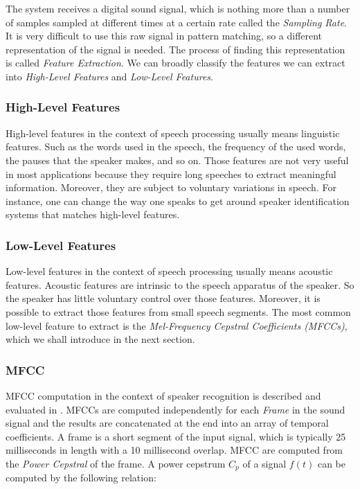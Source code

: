 \documentclass[twocolumn]{article}
\begin{document}
The system receives a digital sound signal, which is nothing more than a number
of samples sampled at different times at a certain rate called the
\emph{Sampling Rate}. It is very difficult to use this raw signal in pattern
matching, so a different representation of the signal is needed. The process of
finding this representation is called \emph{Feature Extraction}. We can broadly
classify the features we can extract into \emph{High-Level Features} and
\emph{Low-Level Features}.

\subsubsection{High-Level Features}

High-level features in the context of speech processing usually means
linguistic features. Such as the words used in the speech, the frequency of the
used words, the pauses that the speaker makes, and so on. Those features are
not very useful in most applications because they require long speeches to
extract meaningful information. Moreover, they are subject to voluntary
variations in speech. For instance, one can change the way one speaks to get
around speaker identification systems that matches high-level features.

\subsubsection{Low-Level Features}

Low-level features in the context of speech processing usually means acoustic
features. Acoustic features are intrinsic to the speech apparatus of the
speaker. So the speaker has little voluntary control over those features.
Moreover, it is possible to extract those features from small speech segments.
The most common low-level feature to extract is the \emph{Mel-Frequency
Cepstral Coefficients (MFCCs)}, which we shall introduce in the next section.

\subsubsection{MFCC}

MFCC computation in the context of speaker recognition is described and
evaluated in \autocite{Sahidullah2012}. MFCCs are computed independently for
each \emph{Frame} in the sound signal and the results are  concatenated at the
end into an array of temporal coefficients. A frame is a short segment of the
input signal, which is typically 25 milliseconds in length with a 10
millisecond overlap. MFCC are computed from the \emph{Power Cepstral} of the
frame. A power cepstrum $C_{p}$ of a signal $f(t)$ can be computed by the
following relation:
\end{document}
